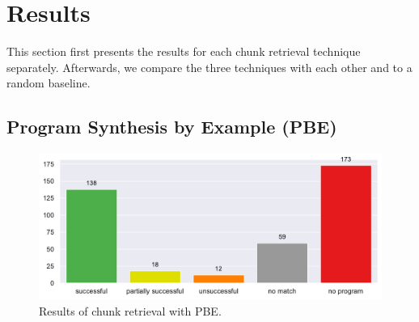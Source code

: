 \section{Results}
This section first presents the results for each chunk retrieval
technique separately.
Afterwards, we compare the three techniques with each other and to a
random baseline.

\subsection{Program Synthesis by Example (PBE)}
\label{sec:r:pbe}

\begin{figure}[tbp]
		\centering
		\includegraphics[width=\columnwidth,
		clip]{img/big-study/failure-reason-pbe.pdf}
		\caption{Results of chunk retrieval with PBE.}
		\label{fig:failure-reason-PBE}
\end{figure}

